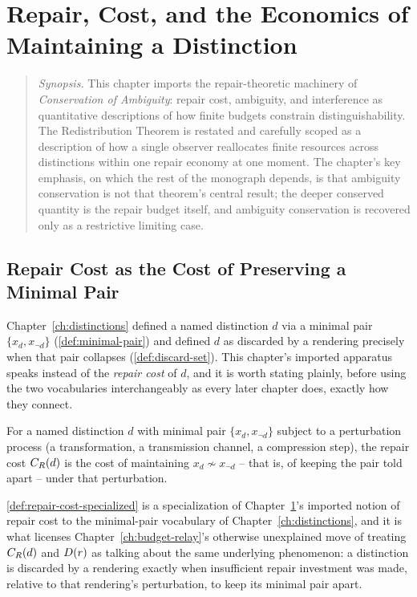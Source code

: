 \chapter{Repair, Cost, and the Economics of Maintaining a Distinction}
\label{ch:repair-economics}

\begin{quotation}
\noindent\textit{Synopsis.} This chapter imports the repair-theoretic
machinery of \emph{Conservation of Ambiguity}: repair cost, ambiguity, and
interference as quantitative descriptions of how finite budgets constrain
distinguishability. The Redistribution Theorem is restated and carefully
scoped as a description of how a single observer reallocates finite
resources across distinctions within one repair economy at one moment. The
chapter's key emphasis, on which the rest of the monograph depends, is that
ambiguity conservation is not that theorem's central result; the deeper
conserved quantity is the repair budget itself, and ambiguity conservation
is recovered only as a restrictive limiting case.
\end{quotation}

\section{Repair Cost as the Cost of Preserving a Minimal Pair}

Chapter~\ref{ch:distinctions} defined a named distinction $d$ via a
minimal pair $\{x_d, x_{\neg d}\}$ (\cref{def:minimal-pair}) and defined
$d$ as discarded by a rendering precisely when that pair collapses
(\cref{def:discard-set}). This chapter's imported apparatus speaks
instead of the \emph{repair cost} of $d$, and it is worth stating plainly,
before using the two vocabularies interchangeably as every later chapter
does, exactly how they connect.

\begin{definition}
\label{def:repair-cost-specialized}
For a named distinction $d$ with minimal pair $\{x_d, x_{\neg d}\}$
subject to a perturbation process (a transformation, a transmission
channel, a compression step), the repair cost $C_R(d)$ is the cost of
maintaining $x_d \not\sim x_{\neg d}$ -- that is, of keeping the pair told
apart -- under that perturbation.
\end{definition}

\cref{def:repair-cost-specialized} is a specialization of
Chapter~\ref{ch:repair-economics}'s imported notion of repair cost to the
minimal-pair vocabulary of Chapter~\ref{ch:distinctions}, and it is what
licenses Chapter~\ref{ch:budget-relay}'s otherwise unexplained move of
treating $C_R(d)$ and $D(r)$ as talking about the same
underlying phenomenon: a distinction is discarded by a rendering exactly
when insufficient repair investment was made, relative to that
rendering's perturbation, to keep its minimal pair apart.

